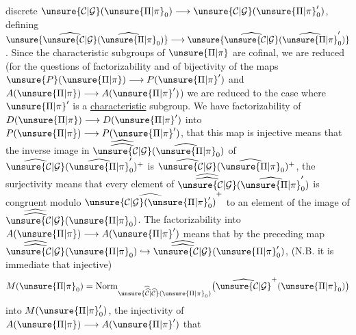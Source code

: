 discrete $\unsure{\mathcal{C}|\mathcal{G}}(\unsure{\Pi|\pi}_0)\longrightarrow\unsure{\mathcal{C}|\mathcal{G}}(\unsure{\Pi|\pi}'_0)$, defining  $\unsure{\widehat{\unsure{\mathcal{C}|\mathcal{G}}}(\widehat{\unsure{\Pi|\pi}}_0)}\longrightarrow\unsure{\widehat{\unsure{\mathcal{C}|\mathcal{G}}}(\widehat{\unsure{\Pi|\pi}}'_0)}$. Since the  characteristic subgroups of $\unsure{\Pi|\pi}$ are cofinal, we are reduced (for the questions of factorizability  and of bijectivity of the maps $\unsure{P}(\unsure{\Pi|\pi})\longrightarrow P(\unsure{\Pi|\pi}')$ and $A(\unsure{\Pi|\pi})\longrightarrow A(\unsure{\Pi|\pi}')$) we are reduced to the case where $\unsure{\Pi|\pi}'$ is a \uline{characteristic} subgroup. We have    factorizability of $D(\unsure{\Pi|\pi})\longrightarrow D(\unsure{\Pi|\pi}')$ into $P(\unsure{\Pi|\pi})\longrightarrow P(\unsure{\Pi|\pi}')$,   that this map is injective   
 means that the inverse image in $\widehat{\widehat{\unsure{\mathcal{C}|\mathcal{G}}}}(\widehat{\unsure{\Pi|\pi}}_0)$ of $\widehat{\unsure{\mathcal{C}|\mathcal{G}}}(\widehat{\unsure{\Pi|\pi}}'_0)^+$ is $\widehat{\unsure{\mathcal{C}|\mathcal{G}}}(\widehat{\unsure{\Pi|\pi}}_0)^+$, the surjectivity  means that every element of $\widehat{\widehat{\unsure{\mathcal{C}|\mathcal{G}}}}(\widehat{\unsure{\Pi|\pi}}'_0)$ is congruent modulo $\widehat{\unsure{\mathcal{C}|\mathcal{G}}(\unsure{\Pi|\pi}'_0)}^+$ to an element of the image of $\widehat{\widehat{\unsure{\mathcal{C}|\mathcal{G}}}}(\unsure{\Pi|\pi}_0)$. The factorizability into $A(\unsure{\Pi|\pi})\longrightarrow A(\unsure{\Pi|\pi}')$ means that by  the preceding map  $\widehat{\widehat{\unsure{\mathcal{C}|\mathcal{G}}}}(\unsure{\Pi|\pi}_0)\hookrightarrow\widehat{\widehat{\unsure{\mathcal{C}|\mathcal{G}}}}(\unsure{\Pi|\pi}'_0)$, (N.B. it is immediate that  injective)  
\[
M(\unsure{\Pi|\pi}_0)=\operatorname{Norm}_{\unsure{\widehat{\widehat{\mathcal{C}}}|\widehat{\mathcal{C}}}(\unsure{\Pi|\pi}_0)}\bigl(\widehat{\unsure{\mathcal{C}|\mathcal{G}}}^{+}(\unsure{\Pi|\pi}_0)\bigr)
\]
into $M(\unsure{\Pi|\pi}'_0)$, the injectivity of $A(\unsure{\Pi|\pi})\longrightarrow A(\unsure{\Pi|\pi}')$ that

